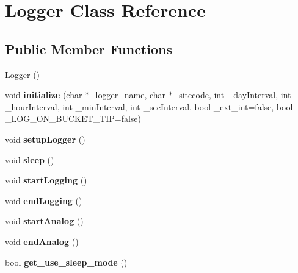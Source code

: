 \hypertarget{classLogger}{}\section{Logger Class Reference}
\label{classLogger}
\subsection*{Public Member Functions}
\begin{DoxyCompactItemize}
\item 
\hyperlink{classLogger_abc41bfb031d896170c7675fa96a6b30c}{Logger} ()
\item 
void {\bfseries initialize} (char $\ast$\+\_\+logger\+\_\+name, char $\ast$\+\_\+sitecode, int \+\_\+day\+Interval, int \+\_\+hour\+Interval, int \+\_\+min\+Interval, int \+\_\+sec\+Interval, bool \+\_\+ext\+\_\+int=false, bool \+\_\+\+L\+O\+G\+\_\+\+O\+N\+\_\+\+B\+U\+C\+K\+E\+T\+\_\+\+T\+IP=false)\hypertarget{classLogger_a9495e2c8e63850f3c7cfcc31e9d73ffe}{}\label{classLogger_a9495e2c8e63850f3c7cfcc31e9d73ffe}

\item 
void {\bfseries setup\+Logger} ()\hypertarget{classLogger_ab5e0bd543758c65a17b77553a0e9f0c9}{}\label{classLogger_ab5e0bd543758c65a17b77553a0e9f0c9}

\item 
void {\bfseries sleep} ()\hypertarget{classLogger_ad90ff8f29410f6b70cc6334391400a4e}{}\label{classLogger_ad90ff8f29410f6b70cc6334391400a4e}

\item 
void {\bfseries start\+Logging} ()\hypertarget{classLogger_a4a6c78dd1715b33ae4bbd6f66f116f77}{}\label{classLogger_a4a6c78dd1715b33ae4bbd6f66f116f77}

\item 
void {\bfseries end\+Logging} ()\hypertarget{classLogger_aa82814d61687debcf3b8dd6f46c9d549}{}\label{classLogger_aa82814d61687debcf3b8dd6f46c9d549}

\item 
void {\bfseries start\+Analog} ()\hypertarget{classLogger_af936c7f58e23316abb5614cbd31c7ced}{}\label{classLogger_af936c7f58e23316abb5614cbd31c7ced}

\item 
void {\bfseries end\+Analog} ()\hypertarget{classLogger_adca7be8a63592263c67f63766680d16f}{}\label{classLogger_adca7be8a63592263c67f63766680d16f}

\item 
bool {\bfseries get\+\_\+use\+\_\+sleep\+\_\+mode} ()\hypertarget{classLogger_acc758b6fdaac8099c492929aa7f1691d}{}\label{classLogger_acc758b6fdaac8099c492929aa7f1691d}


\end{DoxyCompactItemize}
